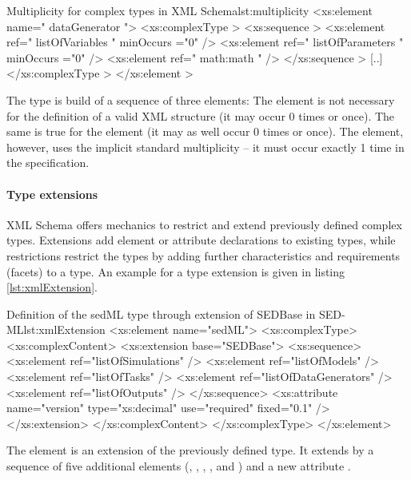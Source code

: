 \begin{myXmlLst}{Multiplicity for complex types in XML Schema}{lst:multiplicity}
<xs:element name=" dataGenerator ">
 <xs:complexType >
  <xs:sequence >
   <xs:element ref=" listOfVariables " minOccurs ="0" />
   <xs:element ref=" listOfParameters " minOccurs ="0" />
   <xs:element ref=" math:math " />
  </xs:sequence >
  [..]
 </xs:complexType >
</xs:element >
\end{myXmlLst}
%
The  type is build of a sequence of three elements: The  element is not necessary for the definition of a valid  XML structure (it may occur 0 times or once). The same is true for the  element (it may as well occur 0 times or once). The  element, however, uses the implicit standard multiplicity -- it must occur exactly 1 time in the  specification.

\paragraph{Type extensions}
XML Schema offers mechanics to restrict and extend previously defined complex types. Extensions add element or attribute declarations to existing types, while restrictions restrict the types by adding further characteristics and requirements (facets) to a type. An example for a type extension is given in listing \ref{lst:xmlExtension}.
%
\begin{myXmlLst}{Definition of the sedML type through extension of SEDBase in SED-ML}{lst:xmlExtension}
<xs:element name="sedML">
 <xs:complexType>
  <xs:complexContent>
   <xs:extension base="SEDBase">
    <xs:sequence>
     <xs:element ref="listOfSimulations" />
     <xs:element ref="listOfModels" />
     <xs:element ref="listOfTasks" />
     <xs:element ref="listOfDataGenerators" />
     <xs:element ref="listOfOutputs" />
    </xs:sequence>
    <xs:attribute name="version" type="xs:decimal" use="required" fixed="0.1" />
   </xs:extension>
  </xs:complexContent>
 </xs:complexType>
</xs:element>
\end{myXmlLst}
%
The  element is an extension of the previously defined  type. It extends  by a sequence of five additional elements (, , , , and ) and a new attribute .

